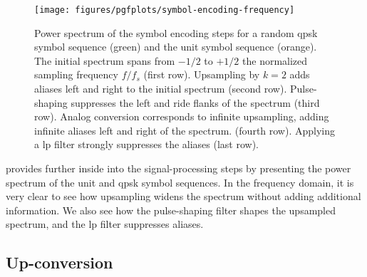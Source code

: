\begin{figure}[htb]
	\centering
	\texttt{[image: figures/pgfplots/symbol-encoding-frequency]}
	\caption{Power spectrum of the symbol encoding steps for a random \gls{qpsk} symbol sequence (green) and the unit symbol sequence (orange). The initial spectrum spans from $-1/2$ to $+1/2$ the normalized sampling frequency $f/f_s$ (first row). Upsampling by $k=2$ adds aliases left and right to the initial spectrum (second row). Pulse-shaping suppresses the left and ride flanks of the spectrum (third row). Analog conversion corresponds to infinite upsampling, adding infinite aliases left and right of the spectrum. (fourth row). Applying a \gls{lp} filter strongly suppresses the aliases (last row).}\label{fig:baseband_construction_freq}
\end{figure}
 provides further inside into the signal-processing steps by presenting the power spectrum of the unit and \gls{qpsk} symbol sequences.
In the frequency domain, it is very clear to see how upsampling widens the spectrum without adding additional information.
We also see how the pulse-shaping filter shapes the upsampled spectrum, and the \gls{lp} filter suppresses aliases.

\FloatBarrier
\subsection{Up-conversion}

